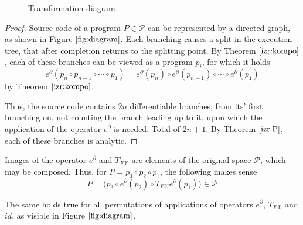\documentclass[smallcondensed]{svjour3}
\newcommand{\X}{\mathcal{X}}
\newcommand{\dP}{\mathcal{P}}
\newcommand{\D}{\partial}
\begin{document}
\begin{wrapfigure}{}{0.5\textwidth}
\caption{Transformation diagram} \label{fig:diagram} 
\vspace{-1.2cm}
\end{wrapfigure}






\begin{proof}
	Source code of a program $P\in\dP$ can be represented by a directed graph, as shown in Figure $\ref{fig:diagram}$. Each branching causes a split in the execution tree, that after completion returns to the splitting point.
	By Theorem $\ref{izr:kompo}$, each of these branches can be viewed as a program $p_i$, for which it holds $$e^\D(p_n\circ p_{n-1}\circ\cdots\circ p_1)=e^\D(p_n)\circ e^\D(p_{n-1})\circ\cdots\circ e^\D(p_1)$$ by Theorem $\ref{izr:kompo}$.
	
	Thus, the source code contains $2n$ differentiable branches, from its' first branching on, not counting the branch leading up to it, upon which the application of the operator $e^\D$ is needed. Total of $2n+1$. By Theorem $\ref{izr:P}$, each of these branches is analytic.
\end{proof}


\begin{proposition}\label{trd:composeOperators}
Images of the operator $e^\D$ and $T_{F\X}$  are elements of the original space $\dP$, which may be composed. Thus, for $P=p_3\circ p_2\circ p_1$, the following makes sense
\begin{equation}
P=\Big(p_3\circ e^ \D(p_2)\circ T_{F\X}e^\D(p_1)\Big) \in \dP
\end{equation}

The same holds true for all permutations of applications of operators $e^\D$, $T_{F\X}$ and $id$, as visible in Figure $\ref{fig:diagram}$.
\end{proposition}
\end{document}
